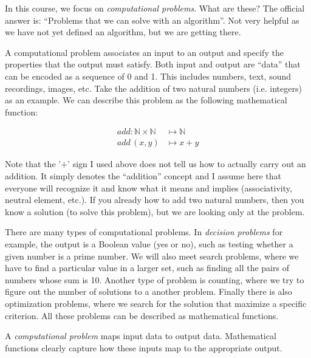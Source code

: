 \documentclass{aldast}
\begin{document}
In this course, we focus on \emph{computational problems}. What are
these?  The official answer is: ``Problems that we can solve with an
algorithm''. Not very helpful as we have not yet defined an algorithm,
but we are getting there.

A computational problem associates an input to an output and specify
the properties that the output must satisfy. Both input and output are
``data'' that can be encoded as a sequence of 0 and 1. This includes
numbers, text, sound recordings, images, etc. Take the addition of two
natural numbers (i.e. integers) as an example. We can describe this
problem as the following mathematical function:

\begin{align}
  add: \mathbb{N} \times \mathbb{N} &\mapsto \mathbb{N} \nonumber \\
  add\, (x, y) & \mapsto x + y
\end{align}

Note that the '$+$' sign I used above does not tell us how to actually
carry out an addition. It simply denotes the ``addition'' concept and
I assume here that everyone will recognize it and know what it means
and implies (associativity, neutral element, etc.). If you already how
to add two natural numbers, then you know a solution (to solve this
problem), but we are looking only at the problem.

There are many types of computational problems. In \emph{decision
  problems} for example, the output is a Boolean value (yes or no),
such as testing whether a given number is a prime number. We will also
meet search problems, where we have to find a particular value in a
larger set, such as finding all the pairs of numbers whose sum is
10. Another type of problem is counting, where we try to figure out
the number of solutions to a another problem. Finally there is also
optimization problems, where we search for the solution that maximize
a specific criterion. All these problems can be described as
mathematical functions.

\begin{takeaway}
  A \emph{computational problem} maps input data to output
  data. Mathematical functions clearly capture how these inputs map to
  the appropriate output.
\end{takeaway}
\end{document}
